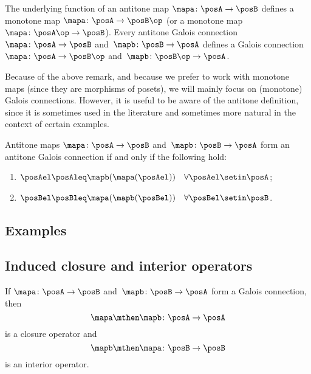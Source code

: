 \begin{remark}\label{rem:not-focusing-on-antitone-Galois-connections}
The underlying function of an antitone map $\mapa\colon \posA\to \posB$ defines a monotone map $\mapa\colon \posA\to \posB\op$ (or a monotone map $\mapa \colon \posA \op \to \posB$). Every antitone Galois connection $\mapa \colon \posA \to \posB$ and~$\mapb \colon \posB \to \posA$ defines a Galois connection $\mapa \colon \posA \to \posB\op$ and~$\mapb \colon \posB\op \to \posA$. 
\end{remark}

Because of the above remark, and because we prefer to work with monotone maps (since they are morphisms of posets), we will mainly focus on (monotone) Galois connections. However, it is useful to be aware of the antitone definition, since it is sometimes used in the literature and sometimes more natural in the context of certain examples.  

\begin{lemma}\label{lem:alternative-def-antitone-Galois-connection}
Antitone maps $\mapa\colon \posA\to \posB$ and~$\mapb\colon \posB\to \posA$ form an antitone Galois connection if and only if the following hold: 
\begin{enumerate}
\item $\posAel\posAleq \mapb(\mapa(\posAel)) \quad \forall \posAel\setin \posA$;
\item $\posBel\posBleq \mapa(\mapb(\posBel)) \quad \forall \posBel\setin \posB$. 
\end{enumerate}
\end{lemma}


\subsection{Examples}



\subsection{Induced closure and interior operators}
    
\begin{lemma}\label{lem:closure-interior-operators-from-Galois-connection}
If $\mapa \colon \posA \to \posB$ and~$\mapb \colon \posB \to \posA$ form a Galois connection, then 
\begin{equation}\label{eq:closure-from-Galois}
\mapa \mthen \mapb \colon \posA \to \posA
\end{equation}
is a closure operator and
\begin{equation}\label{eq:interior-from-Galois}
\mapb \mthen \mapa \colon \posB \to \posB
\end{equation}
is an interior operator. 
\end{lemma}    
    
